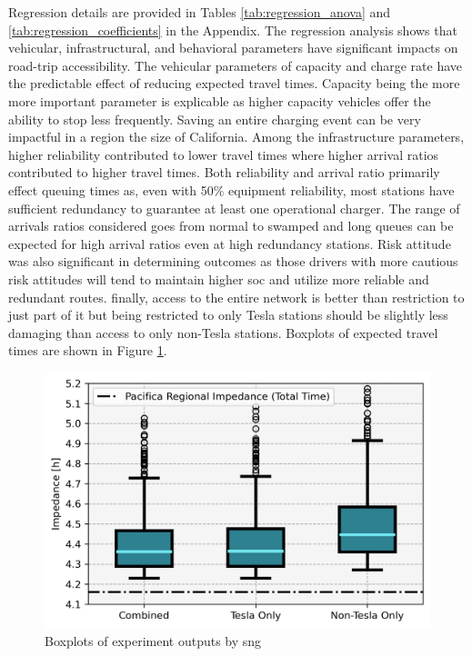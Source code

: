 \begin{multicols}{2}
Regression details are provided in Tables \ref{tab:regression_anova} and \ref{tab:regression_coefficients} in the Appendix. The regression analysis shows that vehicular, infrastructural, and behavioral parameters have significant impacts on road-trip accessibility. The vehicular parameters of capacity and charge rate have the predictable effect of reducing expected travel times. Capacity being the more more important parameter is explicable as higher capacity vehicles offer the ability to stop less frequently. Saving an entire charging event can be very impactful in a region the size of California. Among the infrastructure parameters, higher reliability contributed to lower travel times where higher arrival ratios contributed to higher travel times. Both reliability and arrival ratio primarily effect queuing times as, even with 50\% equipment reliability, most stations have sufficient redundancy to guarantee at least one operational charger. The range of arrivals ratios considered goes from normal to swamped and long queues can be expected for high arrival ratios even at high redundancy stations. Risk attitude was also significant in determining outcomes as those drivers with more cautious risk attitudes will tend to maintain higher \gls{soc} and utilize more reliable and redundant routes. finally, access to the entire network is better than restriction to just part of it but being restricted to only Tesla stations should be slightly less damaging than access to only non-Tesla stations. Boxplots of expected travel times are shown in Figure \ref{fig:networks_boxplots}.

\begin{figure}[H]
	\centering
	\includegraphics[width = \linewidth]{figs/Networks_Boxplots_Weighted_Impedance.png}
	\caption{Boxplots of experiment outputs by \gls{sng}}
	\label{fig:networks_boxplots}
\end{figure}


\end{multicols}
